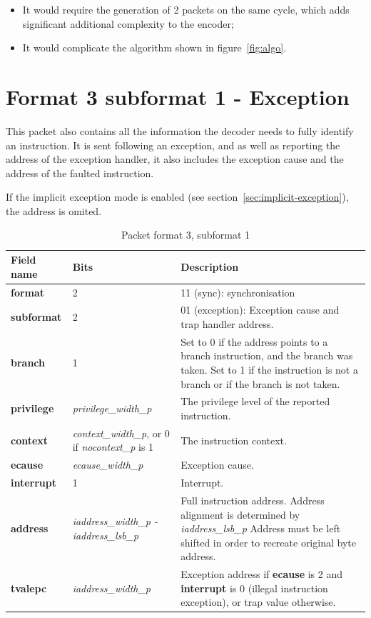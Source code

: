 \begin{itemize}
  \item It would require the generation of 2 packets on the same cycle, which adds significant additional complexity
    to the encoder;
  \item It would complicate the algorithm shown in figure~\ref{fig:algo}. 
\end{itemize}

\FloatBarrier
\section{Format 3 subformat 1 - Exception} \label{sec:format31}

This packet also contains all the information the decoder needs to fully identify an instruction.
It is sent following an exception, and as well as reporting the address of the exception handler, it also 
includes the exception cause and the address of the faulted instruction.

If the implicit exception mode is enabled (see section~\ref{sec:implicit-exception}), the address is omited.

\begin{table}[htp]
  \centering
  \caption{Packet format 3, subformat 1}
  \label{tab:te_inst3}
  \begin{tabulary}{\textwidth}{|l|p{35mm}|p{90mm}|}
    \hline
    {\bf Field name} & {\bf Bits} & {\bf Description} \\
    \hline
    \textbf{format} & 2 & 11 (sync): synchronisation\\
    \hline
    \textbf{subformat} & 2 & 01 (exception): Exception cause and trap handler address.\\
    \hline
    \textbf{branch} & 1 & Set to 0 if the address points to a branch instruction, and the branch was taken.  
              Set to 1 if the instruction is not a branch or if the branch is not taken. \\
    \hline
    \textbf{privilege} & \textit {privilege\_width\_p} & 
                The privilege level of the reported instruction.\\
    \hline
    \textbf{context} &  \textit {context\_width\_p}, 
               or 0 if \textit {nocontext\_p} is 1 & 
               The instruction context. \\
    \hline
    \textbf{ecause} & \textit {ecause\_width\_p} & 
             Exception cause. \\
    \hline
    \textbf{interrupt} & 1 & 
                Interrupt. \\
    \hline
    \textbf{address} & \textit {iaddress\_width\_p - iaddress\_lsb\_p} & 
              Full instruction address.  Address alignment is determined by \textit {iaddress\_lsb\_p} Address must be left shifted in order to recreate original byte address. \\
    \hline
    \textbf{tvalepc} & \textit {iaddress\_width\_p} & 
           Exception address if \textbf{ecause} is 2 and \textbf{interrupt} is 0 (illegal instruction exception), or trap value otherwise.\\
    \hline
  \end{tabulary}
\end{table}

